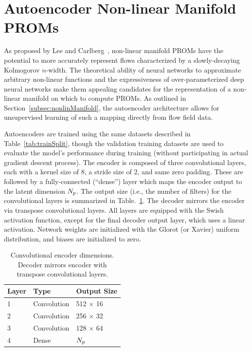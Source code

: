 \section{Autoencoder Non-linear Manifold PROMs}

As proposed by Lee and Carlberg~\cite{Lee2020}, non-linear manifold PROMs have the potential to more accurately represent flows characterized by a slowly-decaying Kolmogorov $n$-width. The theoretical ability of neural networks to approximate arbitrary non-linear functions and the expressiveness of over-parameterized deep neural networks make them appealing candidates for the representation of a non-linear manifold on which to compute PROMs. As outlined in Section~\ref{subsec:nonlinManifold}, the autoencoder architecture allows for unsupervised learning of such a mapping directly from flow field data.

Autoencoders are trained using the same datasets described in Table~\ref{tab:trainSplit}, though the validation training datasets are used to evaluate the model's performance during training (without participating in actual gradient descent process). The encoder is composed of three convolutional layers, each with a kernel size of 8, a stride size of 2, and same zero padding. These are followed by a fully-connected (``dense'') layer which maps the encoder output to the latent dimension $N_p$. The output size (i.e., the number of filters) for the convolutional layers is summarized in Table.~\ref{tab:caeArch}. The decoder mirrors the encoder via transpose convolutional layers. All layers are equipped with the Swish activation function, except for the final decoder output layer, which uses a linear activation. Network weights are initialized with the Glorot (or Xavier) uniform distribution, and biases are initialized to zero.

\begin{table}
	\centering
	\begin{tabular}{ lll }
	\toprule
	Layer & Type & Output Size  \\
	\midrule
	1 & Convolution & 512 $\times$ 16 \\
    2 & Convolution & 256 $\times$ 32 \\
    3 & Convolution & 128 $\times$ 64 \\
    4 & Dense & $N_p$ \\
	\bottomrule
	\end{tabular}
	\caption{\label{tab:caeArch}Convolutional encoder dimensions. Decoder mirrors encoder with transpose convolutional layers.}
\end{table}

